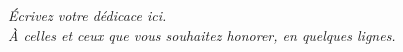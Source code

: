 \chapter*{\dedicationname}
\thispagestyle{plain}
\vspace*{\fill}
\begin{center}
{\itshape
Écrivez votre dédicace ici.\\[1.5em]

À celles et ceux que vous souhaitez honorer, en quelques lignes.
\par}

\vspace{2em}
{\large\itshape \Author}
\end{center}
\vspace*{\fill}
\newpage
